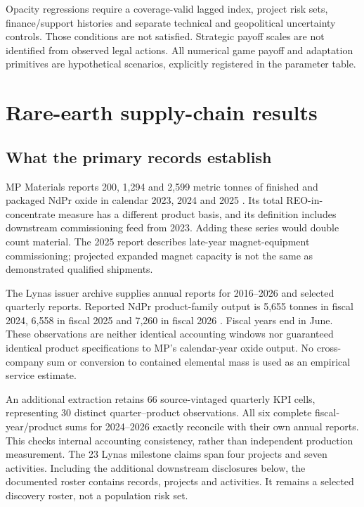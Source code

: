 \documentclass[11pt]{article}
\begin{document}
Opacity regressions require a coverage-valid lagged index, project risk sets, finance/support histories and separate technical and geopolitical uncertainty controls. Those conditions are not satisfied. Strategic payoff scales are not identified from observed legal actions. All numerical game payoff and adaptation primitives are hypothetical scenarios, explicitly registered in the parameter table.

\section{Rare-earth supply-chain results}
\subsection{What the primary records establish}
MP Materials reports 200, 1,294 and 2,599 metric tonnes of finished and packaged NdPr oxide in calendar 2023, 2024 and 2025 \citep{MP2024,MP2025}. Its total REO-in-concentrate measure has a different product basis, and its definition includes downstream commissioning feed from 2023. Adding these series would double count material. The 2025 report describes late-year magnet-equipment commissioning; projected expanded magnet capacity is not the same as demonstrated qualified shipments.

The Lynas issuer archive supplies annual reports for 2016--2026 and selected quarterly reports. Reported NdPr product-family output is 5,655 tonnes in fiscal 2024, 6,558 in fiscal 2025 and 7,260 in fiscal 2026 \citep{Lynas2026}. Fiscal years end in June. These observations are neither identical accounting windows nor guaranteed identical product specifications to MP's calendar-year oxide output. No cross-company sum or conversion to contained elemental mass is used as an empirical service estimate.

An additional extraction retains 66 source-vintaged quarterly KPI cells, representing 30 distinct quarter--product observations. All six complete fiscal-year/product sums for 2024--2026 exactly reconcile with their own annual reports. This checks internal accounting consistency, rather than independent production measurement. The 23 Lynas milestone claims span four projects and seven activities. Including the additional downstream disclosures below, the documented roster contains \ProjectRecords{} records, \ProjectCount{} projects and \ActivityCount{} activities. It remains a selected discovery roster, not a population risk set.
\end{document}
